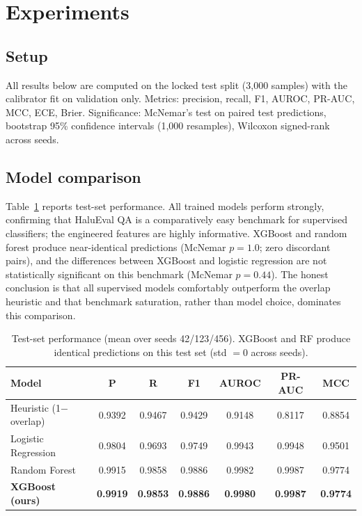 \section{Experiments}

\subsection{Setup}

All results below are computed on the locked test split (3{,}000 samples) with the calibrator fit on validation only. Metrics: precision, recall, F1, AUROC, PR-AUC, MCC, ECE, Brier. Significance: McNemar's test on paired test predictions, bootstrap 95\% confidence intervals (1{,}000 resamples), Wilcoxon signed-rank across seeds.

\subsection{Model comparison}

Table~\ref{tab:models} reports test-set performance. All trained models perform strongly, confirming that HaluEval QA is a comparatively easy benchmark for supervised classifiers; the engineered features are highly informative. XGBoost and random forest produce near-identical predictions (McNemar $p=1.0$; zero discordant pairs), and the differences between XGBoost and logistic regression are not statistically significant on this benchmark (McNemar $p=0.44$). The honest conclusion is that all supervised models comfortably outperform the overlap heuristic and that benchmark saturation, rather than model choice, dominates this comparison.

\begin{table}[t]
\centering
\small
\caption{Test-set performance (mean over seeds 42/123/456). XGBoost and RF produce identical predictions on this test set (std $=0$ across seeds).}
\label{tab:models}
\begin{tabular}{@{}lcccccc@{}}
\toprule
\textbf{Model} & \textbf{P} & \textbf{R} & \textbf{F1} & \textbf{AUROC} & \textbf{PR-AUC} & \textbf{MCC} \\
\midrule
Heuristic (1$-$overlap) & 0.9392 & 0.9467 & 0.9429 & 0.9148 & 0.8117 & 0.8854 \\
Logistic Regression     & 0.9804 & 0.9693 & 0.9749 & 0.9943 & 0.9948 & 0.9501 \\
Random Forest           & 0.9915 & 0.9858 & 0.9886 & 0.9982 & 0.9987 & 0.9774 \\
\textbf{XGBoost (ours)} & \textbf{0.9919} & \textbf{0.9853} & \textbf{0.9886} & \textbf{0.9980} & \textbf{0.9987} & \textbf{0.9774} \\
\bottomrule
\end{tabular}
\end{table}

